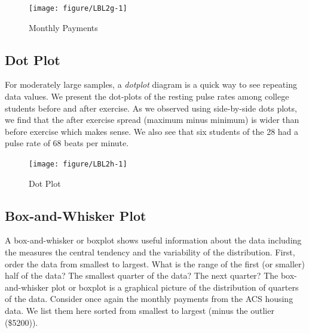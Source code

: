 \documentclass[11pt, chapterprefix=true]{scrbook}\usepackage[]{graphicx}\usepackage[]{color}
\begin{document}
\newpage

\begin{figure}[ht]

\caption{Monthly Payments }



{\centering \texttt{[image: figure/LBL2g-1]} 

}




\end{figure}

\subsection{Dot Plot}

For moderately large samples, a \textit{dotplot} diagram is a quick way to see repeating data values.  We present the dot-plots of the resting pulse rates among college students before and after exercise.  As we observed using side-by-side dots plots, we find that the after exercise spread (maximum minus minimum) is wider than before exercise which makes sense.  We also see that six students of the 28 had a pulse rate of 68 beats per minute.

\begin{figure}[ht]

\caption{Dot Plot }



{\centering \texttt{[image: figure/LBL2h-1]} 

}




\end{figure}

\newpage 

\subsection{Box-and-Whisker Plot}

A box-and-whisker or boxplot shows useful information about the data including the measures the central tendency and the variability of the distribution.  First, order the data from smallest to largest.  What is the range of the first (or smaller) half of the data?  The smallest quarter of the data?  The next quarter?  The box-and-whisker plot or boxplot is a graphical picture of the distribution of quarters of the data.  Consider once again the monthly payments from the ACS housing data.  We list them here sorted from smallest to largest (minus the outlier  (\$5200)).
\end{document}
